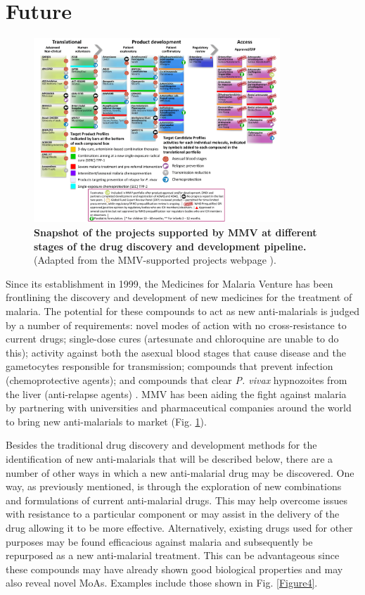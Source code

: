 \documentclass[twocolumn]{bmcart}%
\begin{document}
\section*{Future}
\begin{figure}
	\includegraphics [width=0.825\textwidth] {Figure3}
	\caption{{\bf Snapshot of the projects supported by MMV at different stages of the drug discovery and development pipeline.} (Adapted from the MMV-supported projects webpage \cite{MMV}).}
	\label{Figure3}
\end{figure}
Since its establishment in 1999, the Medicines for Malaria Venture has been frontlining the discovery and development of new medicines for the treatment of malaria. The potential for these compounds to act as new anti-malarials is judged by a number of requirements: novel modes of action with no cross-resistance to current drugs; single-dose cures (artesunate and chloroquine are unable to do this); activity against both the asexual blood stages that cause disease and the gametocytes responsible for transmission; compounds that prevent infection (chemoprotective agents); and compounds that clear \textit{P. vivax} hypnozoites from the liver (anti-relapse agents) \cite{Wells2012,Burrows2017}. MMV has been aiding the fight against malaria by partnering with universities and pharmaceutical companies around the world to bring new anti-malarials to market (Fig. \ref{Figure3}).

Besides the traditional drug discovery and development methods for the identification of new anti-malarials that will be described below, there are a number of other ways in which a new anti-malarial drug may be discovered. One way, as previously mentioned, is through the exploration of new combinations and formulations of current anti-malarial drugs. This may help overcome issues with resistance to a particular component or may assist in the delivery of the drug allowing it to be more effective. Alternatively, existing drugs used for other purposes may be found efficacious against malaria and subsequently be repurposed as a new anti-malarial treatment. This can be advantageous since these compounds may have already shown good biological properties and may also reveal novel MoAs. Examples include those shown in Fig. \ref{Figure4}.
\end{document}
